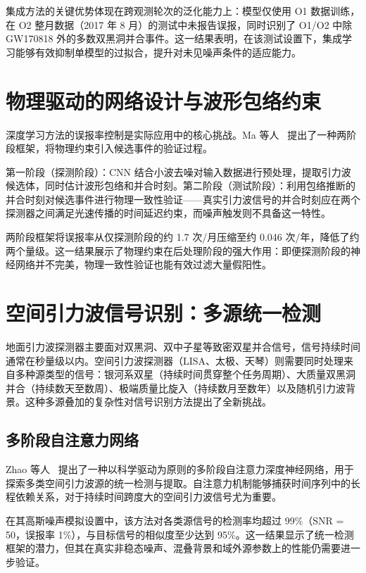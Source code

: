 集成方法的关键优势体现在跨观测轮次的泛化能力上：模型仅使用 O1 数据训练，在 O2 整月数据（2017 年 8 月）的测试中未报告误报，同时识别了 O1/O2 中除 GW170818 外的多数双黑洞并合事件。这一结果表明，在该测试设置下，集成学习能够有效抑制单模型的过拟合，提升对未见噪声条件的适应能力。

\section{物理驱动的网络设计与波形包络约束}

深度学习方法的误报率控制是实际应用中的核心挑战。Ma 等人~\cite{ma2023envelope} 提出了一种两阶段框架，将物理约束引入候选事件的验证过程。

第一阶段（探测阶段）：CNN 结合小波去噪对输入数据进行预处理，提取引力波候选体，同时估计波形包络和并合时刻。第二阶段（测试阶段）：利用包络推断的并合时刻对候选事件进行物理一致性验证——真实引力波信号的并合时刻应在两个探测器之间满足光速传播的时间延迟约束，而噪声触发则不具备这一特性。

两阶段框架将误报率从仅探测阶段的约 1.7 次/月压缩至约 0.046 次/年，降低了约两个量级。这一结果展示了物理约束在后处理阶段的强大作用：即便探测阶段的神经网络并不完美，物理一致性验证也能有效过滤大量假阳性。

\section{空间引力波信号识别：多源统一检测}

地面引力波探测器主要面对双黑洞、双中子星等致密双星并合信号，信号持续时间通常在秒量级以内。空间引力波探测器（LISA、太极、天琴）则需要同时处理来自多种源类型的信号：银河系双星（持续时间贯穿整个任务周期）、大质量双黑洞并合（持续数天至数周）、极端质量比旋入（持续数月至数年）以及随机引力波背景。这种多源叠加的复杂性对信号识别方法提出了全新挑战。

\subsection{多阶段自注意力网络}

Zhao 等人~\cite{zhao2023spacegw} 提出了一种以科学驱动为原则的多阶段自注意力深度神经网络，用于探索多类空间引力波源的统一检测与提取。自注意力机制能够捕获时间序列中的长程依赖关系，对于持续时间跨度大的空间引力波信号尤为重要。

在其高斯噪声模拟设置中，该方法对各类源信号的检测率均超过 99\%（SNR = 50，误报率 1\%），与目标信号的相似度至少达到 95\%。这一结果显示了统一检测框架的潜力，但其在真实非稳态噪声、混叠背景和域外源参数上的性能仍需要进一步验证。

